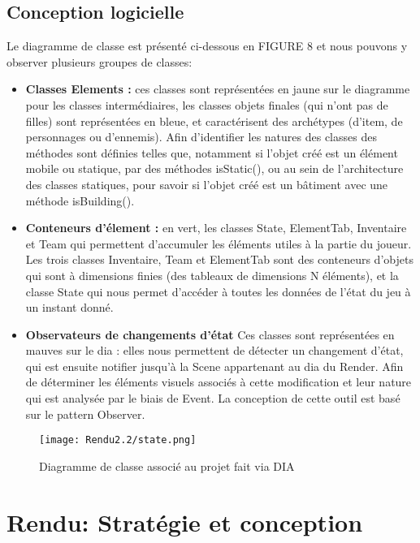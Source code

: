 \documentclass[a4paper,12pt]{article}
\begin{document}
\subsection{Conception logicielle}
Le diagramme de classe est présenté ci-dessous en FIGURE 8 et nous pouvons y observer plusieurs groupes de classes: 
\begin{itemize}
    \item \textbf{Classes Elements :} ces classes sont représentées en jaune sur le diagramme pour les classes intermédiaires, les classes objets finales (qui n'ont pas de filles) sont représentées en bleue, et caractérisent des archétypes (d'item, de personnages ou d'ennemis). Afin d'identifier les natures des classes des méthodes sont définies telles que, notamment si l'objet créé est un élément mobile ou statique, par des méthodes isStatic(), ou au sein de l'architecture des classes statiques, pour savoir si l'objet créé est un bâtiment avec une méthode isBuilding(). 
    \item \textbf{Conteneurs d'élement :} en vert, les classes State, ElementTab, Inventaire et Team qui permettent d'accumuler les éléments utiles à la partie du joueur. Les trois classes Inventaire, Team et ElementTab sont des conteneurs d'objets qui sont à dimensions finies (des tableaux de dimensions N éléments), et la classe State qui nous permet d'accéder à toutes les données de l'état du jeu à un instant donné. 
    \item \textbf{Observateurs de changements d'état} Ces classes sont représentées en mauves sur le dia : elles nous permettent de détecter un changement d'état, qui est ensuite notifier jusqu'à la Scene appartenant au dia du Render. Afin de déterminer les éléments visuels associés à cette modification et leur nature qui est analysée par le biais de Event. La conception de cette outil est basé sur le pattern Observer. 
\end{itemize}

\begin{figure}[!ht]
  \centering
  \texttt{[image: Rendu2.2/state.png]}
  \caption{Diagramme de classe associé au projet fait via DIA}
\end{figure}
\clearpage
\newpage
\section{Rendu: Stratégie et conception}
\end{document}
